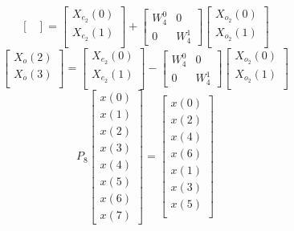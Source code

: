 \documentclass[journal,12pt,twocolumn]{IEEEtran}
\renewcommand\thesection{\arabic{section}}
\begin{document}
\begin{enumerate}[label=\thesection.\arabic*.,ref=\thesection.\theenumi]
\begin{equation}
\begin{bmatrix}
\end{bmatrix}
=
\begin{bmatrix}
X_{e_{2}}(0) \\ 
X_{e_{2}}(1)\\ 
\end{bmatrix}
+
\begin{bmatrix}
W^{0}_{4} & 0\\
0 & W^{1}_{4}
\end{bmatrix}
\begin{bmatrix}
X_{o_{2}}(0) \\ 
X_{o_{2}}(1) \\ 
\end{bmatrix}
\end{equation}
\begin{equation}
\begin{bmatrix}
X_{o}(2) \\ 
X_{o}(3)\\ 
\end{bmatrix}
=
\begin{bmatrix}
X_{e_{2}}(0) \\ 
X_{e_{2}}(1)\\ 
\end{bmatrix}
-
\begin{bmatrix}
W^{0}_{4} & 0\\
0 & W^{1}_{4}
\end{bmatrix}
\begin{bmatrix}
X_{o_{2}}(0) \\ 
X_{o_{2}}(1) \\ 
\end{bmatrix}
\end{equation}
\begin{equation}
P_{8}
\begin{bmatrix}
x(0) \\ 
x(1) \\ 
x(2) \\ 
x(3) \\ 
x(4) \\ 
x(5) \\
x(6) \\
x(7)
\end{bmatrix}
= 
\begin{bmatrix}
x(0) \\ 
x(2) \\ 
x(4) \\ 
x(6) \\
x(1) \\ 
x(3) \\ 
x(5) \\

\end{bmatrix}
\end{equation}
\end{enumerate}
\end{document}
